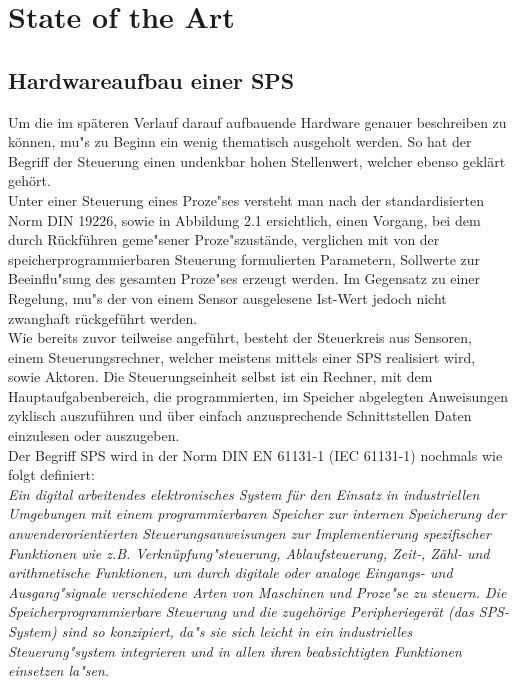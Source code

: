 
\chapter{State of the Art} \label{chapter:stateoftheart}

	\section{Hardwareaufbau einer SPS}
	
	Um die im späteren Verlauf darauf aufbauende Hardware genauer beschreiben zu können, mu"s zu Beginn ein wenig thematisch ausgeholt werden. So hat der Begriff der Steuerung einen undenkbar hohen Stellenwert, welcher ebenso geklärt gehört.\\
	
	Unter einer Steuerung eines Proze"ses versteht man nach der standardisierten Norm DIN 19226, sowie in Abbildung 2.1 ersichtlich, einen Vorgang, bei dem durch Rückführen geme"sener Proze"szustände, verglichen mit von der speicherprogrammierbaren Steuerung formulierten Parametern, Sollwerte zur Beeinflu"sung des gesamten Proze"ses erzeugt werden. Im Gegensatz zu einer Regelung, mu"s der von einem Sensor ausgelesene Ist-Wert jedoch nicht zwanghaft rückgeführt werden. \\
	
	Wie bereits zuvor teilweise angeführt, besteht der Steuerkreis aus Sensoren, einem Steuerungsrechner, welcher meistens mittels einer SPS realisiert wird, sowie Aktoren. Die Steuerungseinheit selbst ist ein Rechner, mit dem Hauptaufgabenbereich, die programmierten, im Speicher abgelegten Anweisungen zyklisch auszuführen und über einfach anzusprechende Schnittstellen Daten einzulesen oder auszugeben. \cite{mseitz_sps} \\
	
	Der Begriff SPS wird in der Norm DIN EN 61131-1 (IEC 61131-1) nochmals wie folgt definiert:\\
	
	\glqq \textit{Ein digital arbeitendes elektronisches System für den Einsatz in industriellen Umgebungen mit einem programmierbaren Speicher zur internen Speicherung der anwenderorientierten Steuerungsanweisungen zur Implementierung spezifischer Funktionen wie z.B. Verknüpfung"steuerung, Ablaufsteuerung, Zeit-, Zähl- und arithmetische Funktionen, um durch digitale oder analoge Eingangs- und Ausgang"signale verschiedene Arten von Maschinen und Proze"se zu steuern. Die Speicherprogrammierbare Steuerung und die zugehörige Peripheriegerät (das SPS- System) sind so konzipiert, da"s sie sich leicht in ein industrielles Steuerung"system integrieren und in allen ihren beabsichtigten Funktionen einsetzen la"sen.}\grqq \space \cite{sps_programmierung}\\
 
